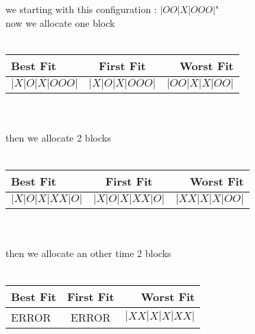 \documentclass{article}
\begin{document}
\begin{itemize}
we starting with this configuration :
$|OO|X|OOO|$"\\
now we allocate one block\\\\
\begin{tabular}{|l|c|r|}
   \hline 
   Best Fit & First Fit & Worst Fit \\
   \hline
   $|X|O|X|OOO|$ & $|X|O|X|OOO|$ & $|OO|X|X|OO|$ \\
   \hline
\end{tabular}
\\
\\then we allocate 2 blocks\\\\
\begin{tabular}{|l|c|r|}
   \hline 
   Best Fit & First Fit & Worst Fit \\
   \hline
   $|X|O|X|XX|O|$ & $|X|O|X|XX|O|$ & $|XX|X|X|OO|$ \\
   \hline
\end{tabular}
\\
\\then we allocate an other time 2 blocks\\\\
\begin{tabular}{|l|c|r|}
   \hline 
   Best Fit & First Fit & Worst Fit \\
   \hline
   ERROR & ERROR & $|XX|X|X|XX|$ \\
   \hline
\end{tabular}


\end{itemize}
\end{document}
